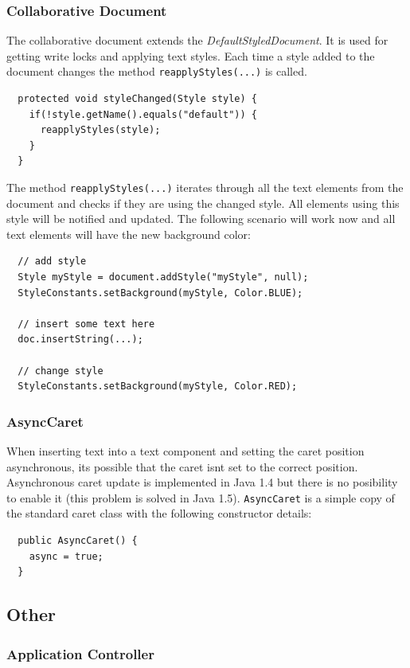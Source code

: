 \subsubsection{Collaborative Document}
The collaborative document extends the \textit{DefaultStyledDocument}. It is used for getting write locks and applying text styles. Each time a style added to the document changes the method \texttt{reapplyStyles(...)} is called.
\begin{verbatim}
  protected void styleChanged(Style style) {
    if(!style.getName().equals("default")) {
      reapplyStyles(style);
    }
  }
\end{verbatim}

The method \texttt{reapplyStyles(...)} iterates through all the text elements from the document and checks if they are using the changed style. All elements using this style will be notified and updated. The following scenario will work now and all text elements will have the new background color:
\begin{verbatim}
  // add style
  Style myStyle = document.addStyle("myStyle", null);
  StyleConstants.setBackground(myStyle, Color.BLUE);
  
  // insert some text here
  doc.insertString(...);
  
  // change style
  StyleConstants.setBackground(myStyle, Color.RED);
\end{verbatim}

\subsubsection{AsyncCaret}
When inserting text into a text component and setting the caret position asynchronous, its possible that the caret isnt set to the correct position. Asynchronous caret update is implemented in Java 1.4 but there is no posibility to enable it (this problem is solved in Java 1.5). \texttt{AsyncCaret} is a simple copy of the standard caret class with the following constructor details:
\begin{verbatim}
  public AsyncCaret() {
    async = true;
  }
\end{verbatim}

\subsection{Other}
\subsubsection{Application Controller}

